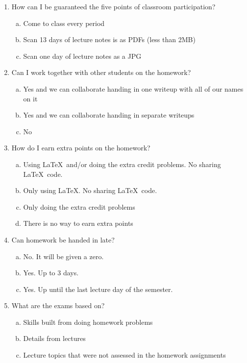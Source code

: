 \begin{enumerate}[1.]
\item How can I be guaranteed the five points of classroom participation?

\begin{enumerate}[(a)]
\item Come to class every period
\item Scan 13 days of lecture notes is as PDFs (less than 2MB)
\item Scan one day of lecture notes as a JPG
\end{enumerate}

\item Can I work together with other students on the homework?

\begin{enumerate}[(a)]
\item Yes and we can collaborate handing in one writeup with all of our names on it
\item Yes and we can collaborate handing in separate writeups
\item No
\end{enumerate}

\item How do I earn extra points on the homework?

\begin{enumerate}[(a)]
\item Using \LaTeX ~and/or doing the extra credit problems. No sharing \LaTeX~code.
\item Only using \LaTeX . No sharing \LaTeX~code.
\item Only doing the extra credit problems
\item There is no way to earn extra points
\end{enumerate}

\item Can homework be handed in late?

\begin{enumerate}[(a)]
\item No. It will be given a zero.
\item Yes. Up to 3 days.
\item Yes. Up until the last lecture day of the semester.
\end{enumerate}


\item What are the exams based on?

\begin{enumerate}[(a)]
\item Skills built from doing homework problems
\item Details from lectures
\item Lecture topics that were not assessed in the homework assignments
\end{enumerate}


\end{enumerate}
